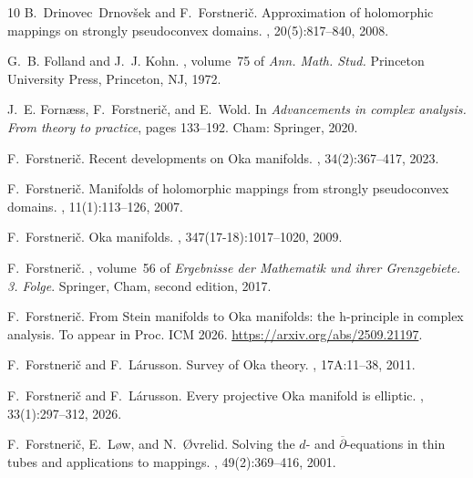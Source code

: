 \documentclass[11pt]{amsart}
\numberwithin{equation}{section}
\theoremstyle{definition}
\begin{document}
\begin{thebibliography}{10}
B.~Drinovec~Drnov{\v{s}}ek and F.~Forstneri\v{c}.
\newblock Approximation of holomorphic mappings on strongly pseudoconvex
  domains.
, 20(5):817--840, 2008.

G.~B. Folland and J.~J. Kohn.
,
  volume~75 of {\em Ann. Math. Stud.}
\newblock Princeton University Press, Princeton, NJ, 1972.

J.~E. {Forn{\ae}ss}, F.~{Forstneri\v{c}}, and E.~{Wold}.
\newblock In {\em {Advancements in complex analysis. From theory to practice}},
  pages 133--192. Cham: Springer, 2020.

F.~Forstneri{\v{c}}.
\newblock Recent developments on {Oka} manifolds.
, 34(2):367--417, 2023.

F.~Forstneri\v{c}.
\newblock Manifolds of holomorphic mappings from strongly pseudoconvex domains.
, 11(1):113--126, 2007.

F.~Forstneri\v{c}.
\newblock Oka manifolds.
, 347(17-18):1017--1020, 2009.

F.~Forstneri\v{c}.
, volume~56 of {\em Ergebnisse der Mathematik und ihrer
  Grenzgebiete. 3. Folge}.
\newblock Springer, Cham, second edition, 2017.

F.~Forstneri{\v c}.
\newblock From Stein manifolds to Oka manifolds: the h-principle in complex
  analysis.
\newblock To appear in Proc. ICM 2026. \url{https://arxiv.org/abs/2509.21197}.

F.~Forstneri\v{c} and F.~L{\'a}russon.
\newblock Survey of {O}ka theory.
, 17A:11--38, 2011.

F.~Forstneri\v{c} and F.~L{\'a}russon.
\newblock Every projective {O}ka manifold is elliptic.
, 33(1):297--312, 2026.

F.~Forstneri\v{c}, E.~L{\o}w, and N.~{\O}vrelid.
\newblock Solving the {$d$}- and {$\overline\partial$}-equations in thin tubes
  and applications to mappings.
, 49(2):369--416, 2001.


\end{thebibliography}
\end{document}
